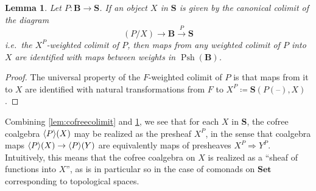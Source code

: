 \documentclass[11pt, oneside, article]{memoir}
\theoremstyle{plain}
\newtheorem{lemma}[theorem]{Lemma}
\theoremstyle{definition}
\theoremstyle{remark}
\DeclareMathOperator{\Psh}{Psh}
\DeclareMathOperator{\El}{El}
\DeclareMathOperator{\ophelper}{op}
\DeclarePairedDelimiter{\gen}{\langle}{\rangle}
\newcommand{\dash}{{\mathord{\text{--}}}}
\newcommand{\op}{^{\ophelper}}
\newcommand{\xto}[1]{\xrightarrow{#1}}
\newcommand{\namedcat}[1]{\mathbf{#1}}
\newcommand{\cat}[1]{\mathbf{#1}}
\newcommand{\Set}{\namedcat{Set}}
\newcommand{\ph}[1]{#1}
\newcommand{\Ps}[1]{\Psh(#1)}
\newcommand{\Ho}[1]{#1}
\newcommand{\xX}{X}
\newcommand{\xY}{Y}
\newcommand{\bB}{\cat{B}}
\newcommand{\bS}{\cat{S}}
\newcommand{\pP}{\ph{P}}
\newcommand{\cP}{\gen{\pP}}
\begin{document}

\begin{lemma}\label{lem:littledense}
  Let $\pP \colon \bB \to \bS$. If an object $\xX$ in $\bS$ is given
  by the canonical colimit of the diagram
  \[(\pP / \xX) \to \bB \xto{\pP} \bS\] i.e.\ the
  $\xX^\pP$-weighted colimit of $\pP$, then maps from any weighted
  colimit of $\pP$ into $\xX$ are identified with maps between weights
  in $\Ps{\bB}$.
\end{lemma}
\begin{proof}
  The universal property of the $F$-weighted colimit of $\pP$ is that
  maps from it to $\xX$ are identified with natural transformations
  from $F$ to $\xX^\pP \coloneqq \Ho{\bS}(\pP(\dash), \xX)$.
\end{proof}

Combining \cref{lem:cofreecolimit} and \cref{lem:littledense}, we see
that for each $\xX$ in $\bS$, the cofree coalgebra $\cP(\xX)$ may be
realized as the presheaf %
$\xX^\pP$, in the sense that coalgebra maps $\cP(\xX) \to \cP(\xY)$
are equivalently maps of presheaves
$\xX^\pP \Rightarrow \xY^\pP$. Intuitively, this means that the cofree
coalgebra on $\xX$ is realized as a ``sheaf of functions into $\xX$'',
as is in particular so in the case of comonads on $\Set$ corresponding
to topological spaces.
\end{document}
